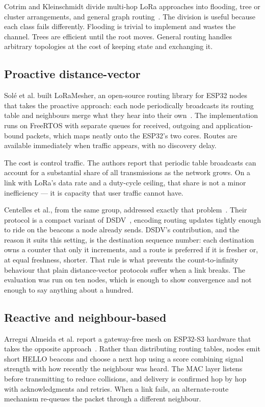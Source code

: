 \documentclass[conference]{IEEEtran}
\begin{document}
Cotrim and Kleinschmidt divide multi-hop LoRa approaches into flooding, tree or
cluster arrangements, and general graph routing~\cite{cotrim2020lorawan}. The
division is useful because each class fails differently. Flooding is trivial to
implement and wastes the channel. Trees are efficient until the root moves.
General routing handles arbitrary topologies at the cost of keeping state and
exchanging it.

\subsection{Proactive distance-vector}

Solé et al. built LoRaMesher, an open-source routing library for ESP32 nodes that
takes the proactive approach: each node periodically broadcasts its routing table
and neighbours merge what they hear into their own~\cite{sole2022loramesher}. The
implementation runs on FreeRTOS with separate queues for received, outgoing and
application-bound packets, which maps neatly onto the ESP32's two cores. Routes
are available immediately when traffic appears, with no discovery delay.

The cost is control traffic. The authors report that periodic table broadcasts
can account for a substantial share of all transmissions as the network grows.
On a link with LoRa's data rate and a duty-cycle ceiling, that share is not a
minor inefficiency — it is capacity that user traffic cannot have.

Centelles et al., from the same group, addressed exactly that
problem~\cite{centelles2024dsdv}. Their protocol is a compact variant of
DSDV~\cite{perkins1994dsdv}, encoding routing updates tightly enough to ride on
the beacons a node already sends. DSDV's contribution, and the reason it suits
this setting, is the destination sequence number: each destination owns a counter
that only it increments, and a route is preferred if it is fresher or, at equal
freshness, shorter. That rule is what prevents the count-to-infinity behaviour
that plain distance-vector protocols suffer when a link breaks. The evaluation
was run on ten nodes, which is enough to show convergence and not enough to say
anything about a hundred.

\subsection{Reactive and neighbour-based}

Arregui Almeida et al. report a gateway-free mesh on ESP32-S3 hardware that takes
the opposite approach~\cite{arregui2025gatewayfree}. Rather than distributing
routing tables, nodes emit short HELLO beacons and choose a next hop using a
score combining signal strength with how recently the neighbour was heard. The
MAC layer listens before transmitting to reduce collisions, and delivery is
confirmed hop by hop with acknowledgments and retries. When a link fails, an
alternate-route mechanism re-queues the packet through a different neighbour.
\end{document}
